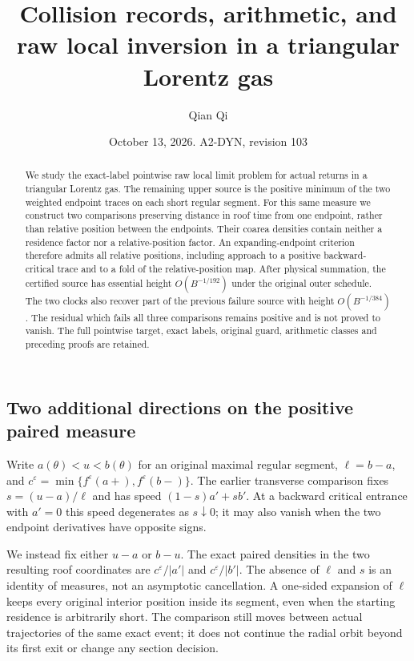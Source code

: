 \documentclass[11pt,reqno]{amsart}
\title[Collision records and raw local inversion]{Collision records, arithmetic, and raw local inversion in a triangular Lorentz gas}
\author{Qian Qi}
\date{October 13, 2026. A2-DYN, revision 103}
\numberwithin{equation}{section}
\theoremstyle{definition}\newtheorem{definition}[theorem]{Definition}
\theoremstyle{remark}\newtheorem{remark}[theorem]{Remark}
\begin{document}
\raggedbottom
\begin{abstract}
We study the exact-label pointwise raw local limit problem for actual
returns in a triangular Lorentz gas. The remaining upper source is
the positive minimum of the two weighted endpoint traces on each
short regular segment. For this same measure we construct two
comparisons preserving distance in roof time from one endpoint,
rather than relative position between the endpoints. Their coarea
densities contain neither a residence factor nor a relative-position
factor. An expanding-endpoint criterion therefore admits all relative
positions, including approach to a positive backward-critical trace
and to a fold of the relative-position map. After physical summation,
the certified source has essential height $O(B^{-1/192})$ under the
original outer schedule. The two clocks also recover part of the
previous failure source with height $O(B^{-1/384})$. The residual
which fails all three comparisons remains positive and is not proved
to vanish. The full pointwise target, exact labels, original guard,
arithmetic classes and preceding proofs are retained.
\end{abstract}
\maketitle


\subsection{Two additional directions on the positive paired measure}
Write $a(\theta)<u<b(\theta)$ for an original maximal regular
segment, $\ell=b-a$, and
$c^\varepsilon=\min\{f^\varepsilon(a+),f^\varepsilon(b-)\}$.
The earlier transverse comparison fixes $s=(u-a)/\ell$ and has
speed $(1-s)a'+sb'$. At a backward critical entrance with $a'=0$
this speed degenerates as $s\downarrow0$; it may also vanish when
the two endpoint derivatives have opposite signs.

We instead fix either $u-a$ or $b-u$. The exact paired densities
in the two resulting roof coordinates are $c^\varepsilon/|a'|$
and $c^\varepsilon/|b'|$. The absence of $\ell$ and $s$ is an
identity of measures, not an asymptotic cancellation. A one-sided
expansion of $\ell$ keeps every original interior position inside
its segment, even when the starting residence is arbitrarily short.
The comparison still moves between actual trajectories of the same
exact event; it does not continue the radial orbit beyond its first
exit or change any section decision.
\end{document}
